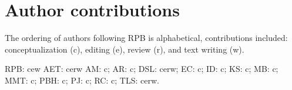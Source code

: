 \documentclass[11pt,]{article}
\begin{document}
\hypertarget{author-contributions}{%
\section{Author contributions}\label{author-contributions}}

The ordering of authors following RPB is alphabetical, contributions
included: conceptualization (c), editing (e), review (r), and text
writing (w).

RPB: cew AET: cerw AM: c; AR: c; DSL: cerw; EC: c; ID: c; KS: c; MB: c;
MMT: c; PBH: c; PJ: c; RC: c; TLS: cerw.





\newpage
\singlespacing
\renewcommand\refname{References}

\end{document}
